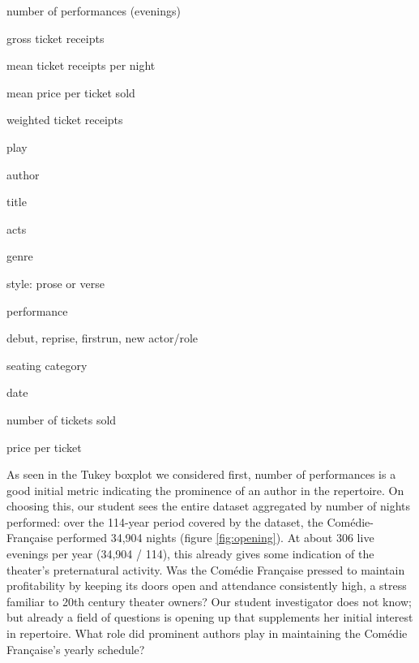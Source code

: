 \documentclass[	DIV=calc,%
							paper=a4,%
							fontsize=11pt,%
							twocolumn]{scrartcl}	 					%
\begin{document}
\begin{framefloat}
	\fontsize{8pt}{8pt}\selectfont
  \begin{description}[noitemsep,align=left]

		\item[Measures]
			\item number of performances (evenings)
			\item gross ticket receipts
			\item mean ticket receipts per night
			\item mean price per ticket sold
			\item weighted ticket receipts

    \vspace{10pt}
		\item[Dimensions]
			\item play
			\item author
			\item title
			\item acts
			\item genre
			\item style: prose or verse
			\item performance
			\item debut, reprise, firstrun, new actor/role
			\item seating category

    \hrulefill
		\item[Facts]
			\item date
			\item number of tickets sold
			\item price per ticket
  \end{description}
\end{framefloat}

As seen in the Tukey boxplot we considered first, number of performances is a good initial metric indicating the prominence of an author in the repertoire.  On choosing this, our student sees the entire dataset aggregated by number of nights performed: over the 114-year period covered by the dataset, the Comédie-Française performed 34,904 nights (figure \ref{fig:opening}).  At about 306 live evenings per year (34,904 / 114), this already gives some indication of the theater’s preternatural activity.  Was the Comédie Française pressed to maintain profitability by keeping its doors open and attendance consistently high, a stress familiar to 20th century theater owners?  Our student investigator does not know; but already a field of questions is opening up that supplements her initial interest in repertoire.  What role did prominent authors play in maintaining the Comédie Française’s yearly schedule?
\end{document}
